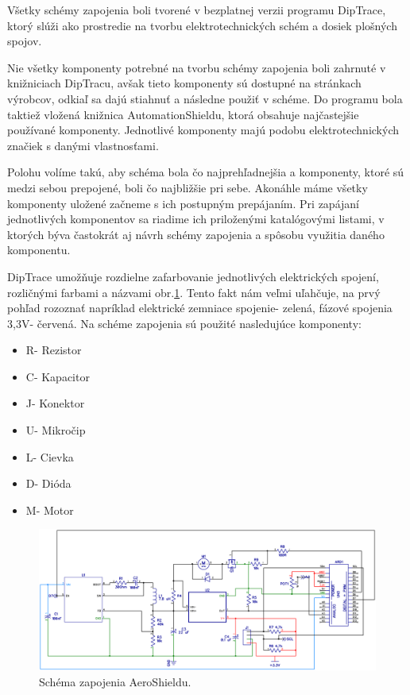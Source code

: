 Všetky schémy zapojenia boli tvorené v bezplatnej verzii programu DipTrace, ktorý slúži ako prostredie na tvorbu elektrotechnických schém a dosiek plošných spojov. 

Nie všetky komponenty potrebné na tvorbu schémy zapojenia boli zahrnuté v knižniciach DipTracu, avšak tieto komponenty sú dostupné na stránkach výrobcov, odkiaľ sa dajú stiahnuť a následne použiť v schéme\cite{AS5600Downl}\cite{TPS56339Downl}\cite{INAobr}. Do programu bola taktiež vložená knižnica AutomationShieldu, ktorá obsahuje najčastejšie používané komponenty. Jednotlivé komponenty majú podobu elektrotechnických značiek s danými vlastnosťami. 

Polohu volíme takú, aby schéma bola čo najprehľadnejšia a komponenty, ktoré sú medzi sebou prepojené, boli čo najbližšie pri sebe. Akonáhle máme všetky komponenty uložené začneme s ich postupným prepájaním. Pri zapájaní jednotlivých komponentov sa riadime ich priloženými katalógovými listami, v ktorých býva častokrát aj návrh schémy zapojenia a spôsobu využitia daného komponentu.

DipTrace umožňuje rozdielne zafarbovanie jednotlivých elektrických spojení, rozličnými farbami a názvami obr.\ref{OBRAZOK 2.3.5}. Tento fakt nám veľmi uľahčuje, na prvý pohľad rozoznať napríklad elektrické zemniace spojenie- zelená, fázové spojenia 3,3V- červená. Na schéme zapojenia sú použité nasledujúce komponenty:
\begin{multicols}{3}
	\begin{itemize}
		\item R- Rezistor
		\item C- Kapacitor
		\item J- Konektor
		\item U- Mikročip
		\item L- Cievka
		\item D- Dióda
		\item M- Motor
	\end{itemize}
\end{multicols}


\begin{figure}[!tbh]
	\includegraphics[width=\textwidth]{obr/aeroSchema.png}
	\caption{Schéma zapojenia AeroShieldu.}\label{OBRAZOK 2.3.5}
\end{figure}

